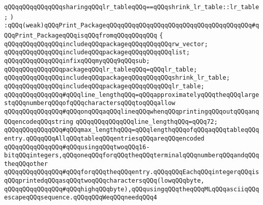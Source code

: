 \newline
\verb|qQQqqQQqqQQqqQQqsharingqQQqlr_tableqQQq==qQQqshrink_lr_table::lr_table;|\newline
\verb|)|\newline
\verb|:qQQq(weak)qQQqPrint_PackageqQQqqQQqqQQqqQQqqQQqqQQqqQQqqQQqqQQqqQQq#qQQqPrint_PackageqQQqisqQQqfromqQQqqQQqqQQq|\newline
\verb|{|\newline
\verb|qQQqqQQqqQQqqQQqincludeqQQqpackageqQQqqQQqqQQqrw_vector;|\newline
\verb|qQQqqQQqqQQqqQQqincludeqQQqpackageqQQqqQQqqQQqlist;|\newline
\newline
\verb|qQQqqQQqqQQqqQQqinfixqQQqmyqQQq9qQQqsub;|\newline
\newline
\verb|qQQqqQQqqQQqqQQqpackageqQQqlr_tableqQQq=qQQqlr_table;|\newline
\newline
\verb|qQQqqQQqqQQqqQQqincludeqQQqpackageqQQqqQQqqQQqshrink_lr_table;|\newline
\verb|qQQqqQQqqQQqqQQqincludeqQQqpackageqQQqqQQqqQQqlr_table;|\newline
\newline
\newline
\verb|qQQqqQQqqQQqqQQq#qQQqline_lengthqQQq=qQQqapproximatelyqQQqtheqQQqlargestqQQqnumberqQQqofqQQqcharactersqQQqtoqQQqallow|\newline
\verb|qQQqqQQqqQQqqQQq#qQQqonqQQqaqQQqlineqQQqwhenqQQqprintingqQQqoutqQQqanqQQqencodeqQQqstring|\newline
\newline
\verb|qQQqqQQqqQQqqQQqline_lengthqQQq=qQQq72;|\newline
\newline
\verb|qQQqqQQqqQQqqQQq#qQQqmax_lengthqQQq=qQQqlengthqQQqofqQQqaqQQqtableqQQqentry.qQQqqQQqAllqQQqtableqQQqentriesqQQqareqQQqencoded|\newline
\verb|qQQqqQQqqQQqqQQq#qQQqusingqQQqtwoqQQq16-bitqQQqintegers,qQQqoneqQQqforqQQqtheqQQqterminalqQQqnumberqQQqandqQQqtheqQQqother|\newline
\verb|qQQqqQQqqQQqqQQq#qQQqforqQQqtheqQQqentry.qQQqqQQqEachqQQqintegerqQQqisqQQqprintedqQQqasqQQqtwoqQQqcharactersqQQq(lowqQQqbyte,|\newline
\verb|qQQqqQQqqQQqqQQq#qQQqhighqQQqbyte),qQQqusingqQQqtheqQQqMLqQQqasciiqQQqescapeqQQqsequence.qQQqqQQqWeqQQqneedqQQq4|\newline
